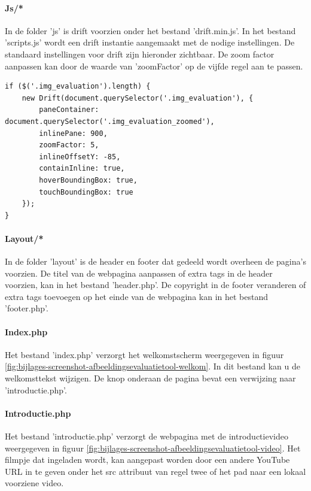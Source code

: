 \paragraph{Js/*}
\label{sec:onderzoek-evaluatietool-setup-js}

In de folder 'js' is \gls{drift} voorzien onder het bestand 'drift.min.js'. In het bestand 'scripts.js' wordt een \gls{drift} instantie aangemaakt met de nodige instellingen. De standaard instellingen voor drift zijn hieronder zichtbaar. De zoom factor aanpassen kan door de waarde van 'zoomFactor' op de vijfde regel aan te passen.

\begin{lstlisting}[style=htmlcssjs]
if ($('.img_evaluation').length) {
	new Drift(document.querySelector('.img_evaluation'), {
		paneContainer: document.querySelector('.img_evaluation_zoomed'),
		inlinePane: 900,
		zoomFactor: 5,
		inlineOffsetY: -85,
		containInline: true,
		hoverBoundingBox: true,
		touchBoundingBox: true
	});
}
\end{lstlisting}

\paragraph{Layout/*}
\label{sec:onderzoek-evaluatietool-setup-layout}

In de folder 'layout' is de header en footer dat gedeeld wordt overheen de pagina's voorzien. De titel van de webpagina aanpassen of extra tags in de header voorzien, kan in het bestand 'header.php'. De copyright in de footer veranderen of extra tags toevoegen op het einde van de webpagina kan in het bestand 'footer.php'.

\paragraph{Index.php}
\label{sec:onderzoek-evaluatietool-setup-index}

Het bestand 'index.php' verzorgt het welkomstscherm weergegeven in figuur \ref{fig:bijlages-screenshot-afbeeldingsevaluatietool-welkom}. In dit bestand kan u de welkomsttekst wijzigen. De knop onderaan de pagina bevat een verwijzing naar 'introductie.php'.

\paragraph{Introductie.php}
\label{sec:onderzoek-evaluatietool-setup-introductie}

Het bestand 'introductie.php' verzorgt de webpagina met de introductievideo weergegeven in figuur \ref{fig:bijlages-screenshot-afbeeldingsevaluatietool-video}. Het filmpje dat ingeladen wordt, kan aangepast worden door een andere YouTube URL in te geven onder het src attribuut van regel twee of het pad naar een lokaal voorziene video.

